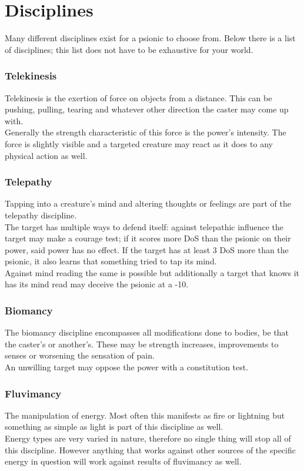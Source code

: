 \documentclass[12pt,a4paper,openany]{book}
\begin{document}
	\section{Disciplines}
	Many different disciplines exist for a psionic to choose from. Below there is a list of disciplines; this list does not have to be exhaustive for your world.
	\subsubsection*{Telekinesis}
	Telekinesis is the exertion of force on objects from a distance. This can be pushing, pulling, tearing and whatever other direction the caster may come up with.\\
	Generally the strength characteristic of this force is the power's intensity. The force is slightly visible and a targeted creature may react as it does to any physical action as well.
	\subsubsection*{Telepathy}
	Tapping into a creature's mind and altering thoughts or feelings are part of the telepathy discipline.\\
	The target has multiple ways to defend itself: against telepathic influence the target may make a courage test; if it scores more DoS than the psionic on their power, said power has no effect. If the target has at least 3 DoS more than the psionic, it also learns that something tried to tap its mind.\\
	Against mind reading the same is possible but additionally a target that knows it has its mind read may deceive the psionic at a -10.
	\subsubsection*{Biomancy}
	The biomancy discipline encompasses all modifications done to bodies, be that the caster's or another's. These may be strength increases, improvements to senses or worsening the sensation of pain.\\
	An unwilling target may oppose the power with a constitution test.
	\subsubsection*{Fluvimancy}
	The manipulation of energy. Most often this manifests as fire or lightning but something as simple as light is part of this discipline as well.\\
	Energy types are very varied in nature, therefore no single thing will stop all of this discipline. However anything that works against other sources of the specific energy in question will work against results of fluvimancy as well.
\end{document}
